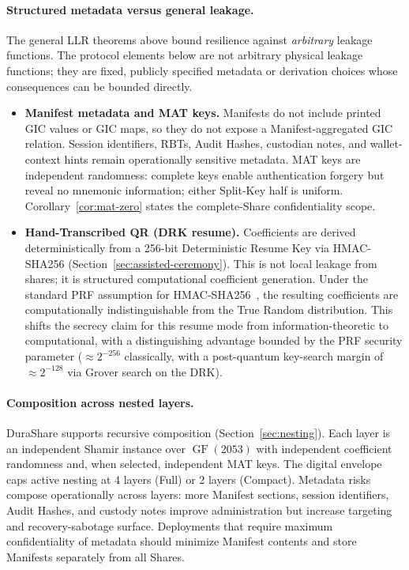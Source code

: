 \documentclass[11pt]{article}
\newcommand{\GF}{\operatorname{GF}}
\begin{document}
\paragraph{Structured metadata versus general leakage.} The general LLR theorems above bound resilience against \emph{arbitrary} leakage functions. The protocol elements below are not arbitrary physical leakage functions; they are fixed, publicly specified metadata or derivation choices whose consequences can be bounded directly.
\begin{itemize}[noitemsep]
    \item \textbf{Manifest metadata and MAT keys.} Manifests do not include printed GIC values or GIC maps, so they do not expose a Manifest-aggregated GIC relation. Session identifiers, RBTs, Audit Hashes, custodian notes, and wallet-context hints remain operationally sensitive metadata. MAT keys are independent randomness: complete keys enable authentication forgery but reveal no mnemonic information; either Split-Key half is uniform. Corollary~\ref{cor:mat-zero} states the complete-Share confidentiality scope.
    \item \textbf{Hand-Transcribed QR (DRK resume).} Coefficients are derived deterministically from a 256-bit Deterministic Resume Key via HMAC-SHA256 (Section~\ref{sec:assisted-ceremony}). This is not local leakage from shares; it is structured computational coefficient generation. Under the standard PRF assumption for HMAC-SHA256~\cite{rfc2104}, the resulting coefficients are computationally indistinguishable from the True Random distribution. This shifts the secrecy claim for this resume mode from information-theoretic to computational, with a distinguishing advantage bounded by the PRF security parameter ($\approx 2^{-256}$ classically, with a post-quantum key-search margin of $\approx 2^{-128}$ via Grover search on the DRK).
\end{itemize}

\paragraph{Composition across nested layers.} DuraShare supports recursive composition (Section~\ref{sec:nesting}). Each layer is an independent Shamir instance over $\GF(2053)$ with independent coefficient randomness and, when selected, independent MAT keys. The digital envelope caps active nesting at 4 layers (Full) or 2 layers (Compact). Metadata risks compose operationally across layers: more Manifest sections, session identifiers, Audit Hashes, and custody notes improve administration but increase targeting and recovery-sabotage surface. Deployments that require maximum confidentiality of metadata should minimize Manifest contents and store Manifests separately from all Shares.
\end{document}
